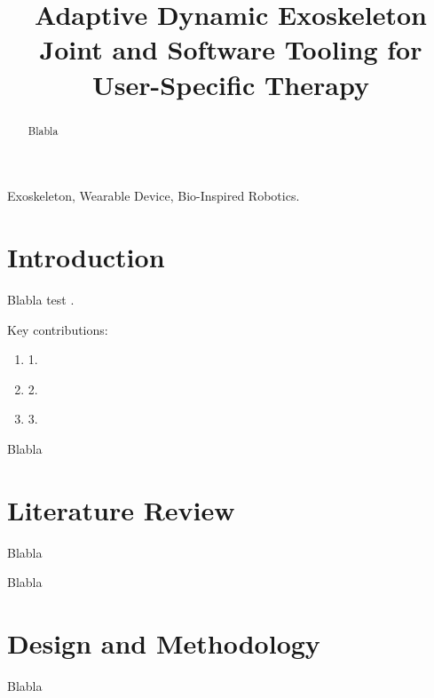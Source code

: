\documentclass[conference]{IEEEtran}
\begin{document}
\title{Adaptive Dynamic Exoskeleton Joint and Software Tooling for User-Specific Therapy}

\author{
}


\maketitle
\begin{abstract}

Blabla

\end{abstract}

\begin{IEEEkeywords}

Exoskeleton, Wearable Device, Bio-Inspired Robotics.

\end{IEEEkeywords}

\section{Introduction}

Blabla \parencite{HRR93}
test \parencite{Atkins_wearable_shoulder_exoskeleton}.

Key contributions:
\begin{enumerate}
\item 1.
\item 2.
\item 3.
\end{enumerate}

Blabla

\section{Literature Review}

Blabla

Blabla

\section{Design and Methodology}

Blabla
\end{document}
